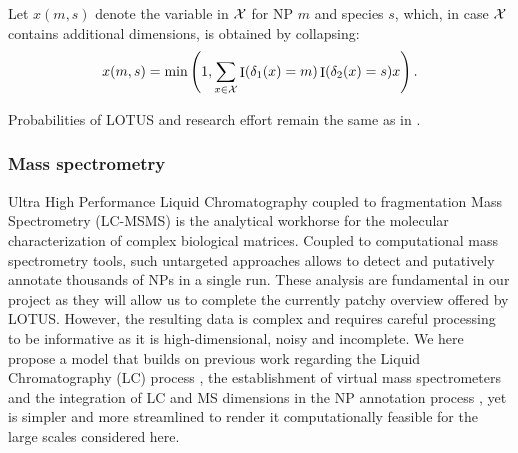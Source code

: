 \documentclass[
11pt, %
oneside, %
english, %
singlespacing, %
headsepline, %
chapterinoneline, %
]{MastersDoctoralThesis} %
\DeclareMathOperator{\Ind}{I}
\def\X{{\cal X}}
\begin{document}
Let $x(m,s)$ denote the variable in $\X$ for NP $m$ and species $s$, which, in case $\X$ contains additional dimensions, is obtained by collapsing:
\begin{equation}
	x(m,s) = \min \left(1, \sum_{x \in \X} \Ind(\delta_1(x)=m) \Ind(\delta_2(x)=s) x \right).
\end{equation}

Probabilities of LOTUS and research effort remain the same as in .

\subsubsection{Mass spectrometry}\label{subsubsec: MS in MRF}
Ultra High Performance Liquid Chromatography coupled to fragmentation Mass Spectrometry (LC-MSMS) is the analytical workhorse for the molecular characterization of complex biological matrices. Coupled to computational mass spectrometry tools, such untargeted approaches allows to detect and putatively annotate thousands of NPs in a single run. These analysis are fundamental in our project as they will allow us to complete the currently patchy overview offered by LOTUS. However, the resulting data is complex and requires careful processing to be informative as it is high-dimensional, noisy and incomplete. We here propose a model that builds on previous work regarding the Liquid Chromatography (LC) process \cite{heymannAdvancedErrorModeling2023, wiczlingApplicationBayesianMultilevel2021}, the establishment of virtual mass spectrometers \cite{wandySilicoOptimizationMass2019, wandyViMMSFrameworkDevelop2022,wandySimulatedtorealBenchmarkingAcquisition2023} and the integration of LC and MS dimensions in the NP annotation process \cite{bachProbabilisticFrameworkIntegration2021, bachJointStructuralAnnotation2022}, yet is simpler and more streamlined to render it computationally feasible for the large scales considered here.
\end{document}
